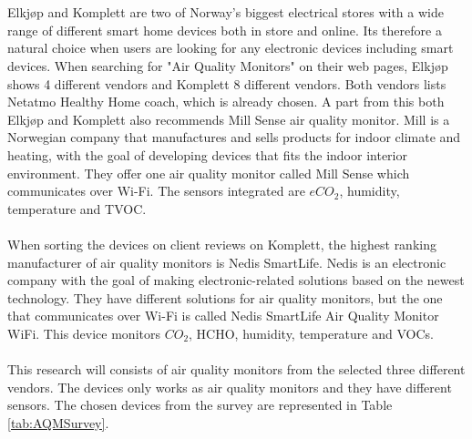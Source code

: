 \\\\
Elkjøp \cite{Elkjøp} and Komplett \cite{Komplett} are two of Norway's biggest electrical stores with a wide range of different smart home devices both in store and online. Its therefore a natural choice when users are looking for any electronic devices including smart devices. When searching for "Air Quality Monitors" on their web pages, Elkjøp shows 4 different vendors and Komplett 8 different vendors. Both vendors lists Netatmo Healthy Home coach, which is already chosen. A part from this both Elkjøp and Komplett also recommends Mill Sense air quality monitor. Mill \cite{Mill} is a Norwegian company that manufactures and sells products for indoor climate and heating, with the goal of developing devices that fits the indoor interior environment. They offer one air quality monitor called Mill Sense which communicates over Wi-Fi. The sensors integrated are \(eCO_2\), humidity, temperature and TVOC.
\\\\
When sorting the devices on client reviews on Komplett, the highest ranking manufacturer of air quality monitors is Nedis SmartLife\cite{Komplett}. Nedis \cite{Nedis} is an electronic company with the goal of making electronic-related solutions based on the newest technology. They have different solutions for air quality monitors, but the one that communicates over Wi-Fi is called Nedis SmartLife Air Quality Monitor WiFi. This device monitors \(CO_2\), HCHO, humidity, temperature and VOCs. 
\\\\
This research will consists of air quality monitors from the selected three different vendors. The devices only works as air quality monitors and they have different sensors. The chosen devices from the survey are represented in Table \ref{tab:AQMSurvey}. 

